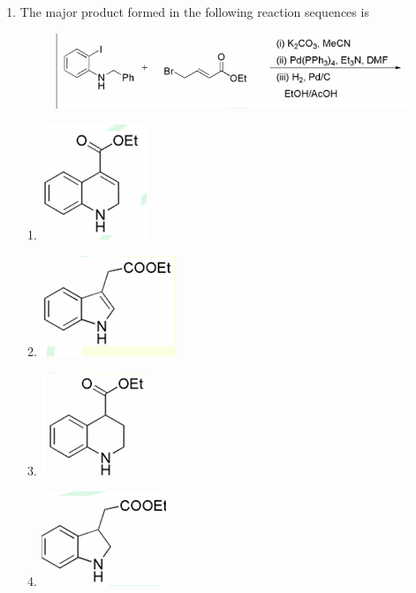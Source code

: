 \documentclass[journal,12pt,onecolumn]{IEEEtran}
\theoremstyle{remark}
\begin{document}
\begin{enumerate}
\item The major product formed in the following reaction sequences is
 \begin{figure}[H]
        \centering
        \includegraphics[width=0.4\columnwidth]{figs/q43.png}
        \caption*{}
        \label{fig:placeholder}
        \end{figure}
         \begin{multicols}{2}
    \begin{enumerate}
        \item \includegraphics[width=0.25\columnwidth]{figs/q43a.png}
        \item \includegraphics[width=0.25\columnwidth]{figs/q43b.png}
        \item \includegraphics[width=0.25\columnwidth]{figs/q43c.png}
        \item \includegraphics[width=0.25\columnwidth]{figs/q43d.png}
    \end{enumerate}      \hfill{}
    \end{multicols}




\end{enumerate}
\end{document}
